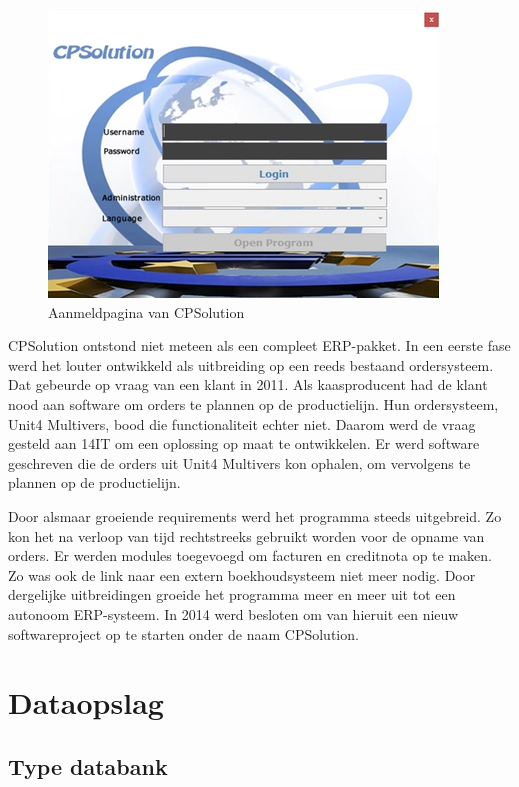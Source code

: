 \begin{figure}[H]
	\centering
	\includegraphics[]{img/erp/cpsolution.png}
	\caption{\label{fig:cpsolution}Aanmeldpagina van CPSolution}
\end{figure}

CPSolution ontstond niet meteen als een compleet ERP-pakket. In een eerste fase werd het louter ontwikkeld als uitbreiding op een reeds bestaand ordersysteem. Dat gebeurde op vraag van een klant in 2011. Als kaasproducent had de klant nood aan software om orders te plannen op de productielijn. Hun ordersysteem, Unit4 Multivers, bood die functionaliteit echter niet. Daarom werd de vraag gesteld aan 14IT om een oplossing op maat te ontwikkelen. Er werd software geschreven die de orders uit Unit4 Multivers kon ophalen, om vervolgens te plannen op de productielijn. 

Door alsmaar groeiende requirements werd het programma steeds uitgebreid. Zo kon het na verloop van tijd rechtstreeks gebruikt worden voor de opname van orders. Er werden modules toegevoegd om facturen en creditnota op te maken. Zo was ook de link naar een extern boekhoudsysteem niet meer nodig. Door dergelijke uitbreidingen groeide het programma meer en meer uit tot een autonoom ERP-systeem. In 2014 werd besloten om van hieruit een nieuw softwareproject op te starten onder de naam CPSolution.

\section{Dataopslag}
\label{sec:dataopslag}

\subsection{Type databank}
\label{sub:type-databank}

